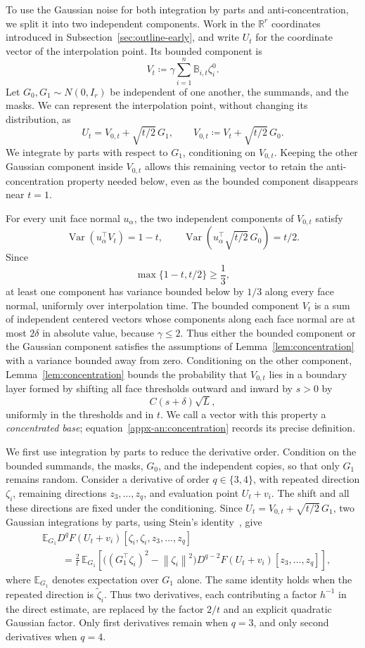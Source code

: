 \documentclass[11pt,letterpaper]{article}
\theoremstyle{remark}
\newcommand{\E}{\mathbb E}
\newcommand{\R}{\mathbb R}
\newcommand{\Var}{\operatorname{Var}}
\newcommand{\norm}[1]{\left\lVert#1\right\rVert}
\begin{document}
To use the Gaussian noise for both integration by parts and
anti-concentration, we split it into two independent components.
Work in the \(\R^r\) coordinates introduced in
Subsection~\ref{sec:outline-early}, and write \(U_t\) for the
coordinate vector of the interpolation point. Its bounded component is
\[
 V_t\coloneqq\gamma\sum_{i=1}^n\mathbb B_{i,t}\zeta_i^0.
\]
Let \(G_0,G_1\sim N(0,I_r)\) be independent of one another, the
summands, and the masks. We can represent the interpolation point,
without changing its distribution, as
\[
 U_t=V_{0,t}+\sqrt{t/2}\,G_1,
 \qquad V_{0,t}\coloneqq V_t+\sqrt{t/2}\,G_0.
\]
We integrate by parts with respect to \(G_1\), conditioning on
\(V_{0,t}\). Keeping the other Gaussian component inside \(V_{0,t}\)
allows this remaining vector to retain the anti-concentration
property needed below, even as the bounded component disappears
near \(t=1\).

For every unit face normal \(u_\alpha\), the two independent
components of \(V_{0,t}\) satisfy
\[
 \Var(u_\alpha^\top V_t)=1-t,
 \qquad
 \Var\!\left(u_\alpha^\top\sqrt{t/2}\,G_0\right)=t/2.
\]
Since
\[
 \max\{1-t,t/2\}\ge\frac13,
\]
at least one component has variance bounded below by \(1/3\) along
every face normal, uniformly over interpolation time. The bounded
component \(V_t\) is a sum of independent centered vectors whose
components along each face normal are at most \(2\delta\) in absolute
value, because \(\gamma\le2\). Thus either the bounded component or
the Gaussian component satisfies the assumptions of
Lemma~\ref{lem:concentration} with a variance bounded away from zero.
Conditioning on the other component,
Lemma~\ref{lem:concentration} bounds the probability that \(V_{0,t}\)
lies in a boundary layer formed by shifting all face thresholds
outward and inward by \(s>0\) by
\[
 C(s+\delta)\sqrt L,
\]
uniformly in the thresholds and in \(t\). We call a vector with this
property a \emph{concentrated base}; equation~\eqref{appx-an:concentration}
records its precise definition.

We first use integration by parts to reduce the derivative order.
Condition on the bounded summands, the masks, \(G_0\), and the
independent copies, so that only \(G_1\) remains random. Consider
a derivative of order \(q\in\{3,4\}\), with repeated direction
\(\zeta_i\), remaining directions \(z_3,\ldots,z_q\), and evaluation
point \(U_t+v_i\). The shift and all these directions are fixed under
the conditioning. Since \(U_t=V_{0,t}+\sqrt{t/2}\,G_1\), two Gaussian
integrations by parts, using Stein's identity~\cite{Stein1981}, give
\[
 \begin{aligned}
 &\E_{G_1}D^qF(U_t+v_i)
       [\zeta_i,\zeta_i,z_3,\ldots,z_q]\\
 &\qquad=\frac2t\,\E_{G_1}\!\left[
   \bigl((G_1^\top\zeta_i)^2-\norm{\zeta_i}^2\bigr)
   D^{q-2}F(U_t+v_i)[z_3,\ldots,z_q]
   \right],
 \end{aligned}
\]
where \(\E_{G_1}\) denotes expectation over \(G_1\) alone.
The same identity holds when the repeated direction is
\(\widetilde\zeta_i\). Thus two derivatives, each contributing a
factor \(h^{-1}\) in the direct estimate, are replaced by the factor
\(2/t\) and an explicit quadratic Gaussian factor. Only first
derivatives remain when \(q=3\), and only second derivatives when
\(q=4\).
\end{document}
